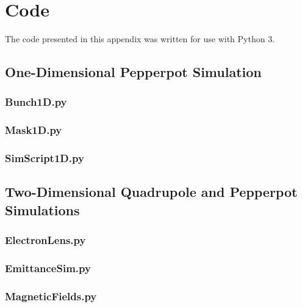 \chapter{Code}\label{appendix:code}

The code presented in this appendix was written for use with Python 3.

\section{One-Dimensional Pepperpot Simulation}

\subsection{Bunch1D.py}


\subsection{Mask1D.py}


\subsection{SimScript1D.py}


\section{Two-Dimensional Quadrupole and Pepperpot Simulations}

\subsection{ElectronLens.py}


\subsection{EmittanceSim.py}


\subsection{MagneticFields.py}


